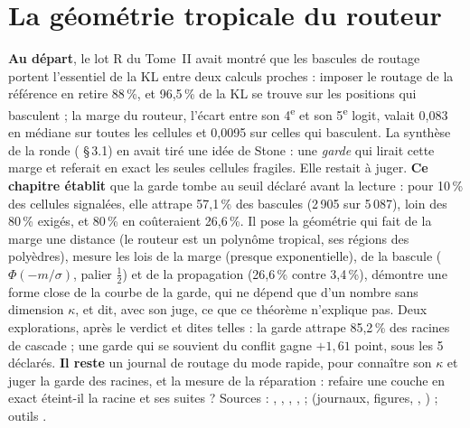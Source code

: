 
\chapter{La géométrie tropicale du routeur}\label{t3tro:ch}

\begin{origine}
\textbf{Au départ}, le lot R du Tome~II avait montré que les bascules de routage portent l'essentiel de la KL entre deux calculs proches : imposer le routage de la référence en retire 88\,\%, et 96,5\,\% de la KL se trouve sur les positions qui basculent ; la marge du routeur, l'écart entre son 4\textsuperscript{e} et son 5\textsuperscript{e} logit, valait 0,083 en médiane sur toutes les cellules et 0,0095 sur celles qui basculent. La synthèse de la ronde ( §\,3.1) en avait tiré une idée de Stone : une \emph{garde} qui lirait cette marge et referait en exact les seules cellules fragiles. Elle restait à juger.
\textbf{Ce chapitre établit} que la garde tombe au seuil déclaré avant la lecture : pour 10\,\% des cellules signalées, elle attrape 57,1\,\% des bascules (2\,905 sur 5\,087), loin des 80\,\% exigés, et 80\,\% en coûteraient 26,6\,\%. Il pose la géométrie qui fait de la marge une distance (le routeur est un polynôme tropical, ses régions des polyèdres), mesure les lois de la marge (presque exponentielle), de la bascule ($\Phi(-m/\sigma)$, palier $\tfrac12$) et de la propagation (26,6\,\% contre 3,4\,\%), démontre une forme close de la courbe de la garde, qui ne dépend que d'un nombre sans dimension $\kappa$, et dit, avec son juge, ce que ce théorème n'explique pas. Deux explorations, après le verdict et dites telles : la garde attrape 85,2\,\% des racines de cascade ; une garde qui se souvient du conflit gagne $+1{,}61$ point, sous les 5 déclarés.
\textbf{Il reste} un journal de routage du mode rapide, pour connaître son $\kappa$ et juger la garde des racines, et la mesure de la réparation : refaire une couche en exact éteint-il la racine et ses suites ?
Sources : , , , ,  ;  (journaux, figures, , ) ; outils .
\end{origine}


